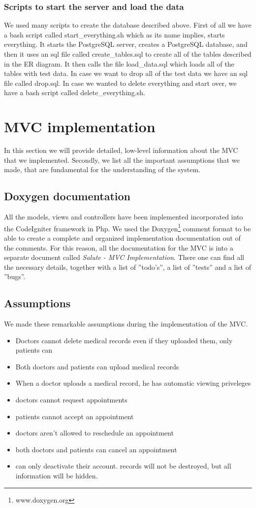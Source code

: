\documentclass[12pt]{report}
\begin{document}
\subsubsection{Scripts to start the server and load the data}
We used many scripts to create the database described above.  First of all we have a bash script called start\_everything.sh which as its name implies, starts everything.  It starts the PostgreSQL server, creates a PostgreSQL database, and then it uses an sql file called create\_tables.sql to create all of the tables described in the ER diagram.  It then calls the file load\_data.sql which loads all of the tables with test data.  In case we want to drop all of the test data we have an sql file called drop.sql.  In case we wanted to delete everything and start over, we have a bash script called delete\_everything.sh. 

\section{MVC implementation}
In this section we will provide detailed, low-level information about the MVC that we implemented. Secondly, we list all the important assumptions that we made, that are fundamental for the understanding of the system.

\subsection{Doxygen documentation}
All the models, views and controllers have been implemented incorporated into the CodeIgniter framework in Php. We used the Doxygen\footnote{www.doxygen.org} comment format to be able to create a complete and organized implementation documentation out of the comments. For this reason, all the documentation for the MVC is into a separate document called \emph{Salute - MVC Implementation}. There one can find all the necessary details, together with a list of ''todo's'', a list of ''tests'' and a list of ''bugs''.

\subsection{Assumptions}
We made these remarkable assumptions during the implementation of the MVC.
\begin{itemize}
\item Doctors cannot delete medical records even if they uploaded them, only patients can
\item Both doctors and patients can upload medical records
\item When a doctor uploads a medical record, he has automatic viewing priveleges
\item doctors cannot request appointments
\item patients cannot accept an appointment
\item doctors aren't allowed to reschedule an appointment
\item both doctors and patients can cancel an appointment
\item can only deactivate their account. records will not be destroyed, but all information will be hidden. 
\end{itemize}
\end{document}
